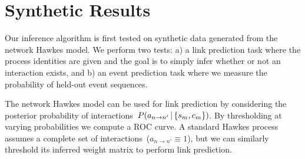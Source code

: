 \section{Synthetic Results}
\label{sec:synth}
Our inference algorithm is first tested on synthetic data generated
from the network Hawkes model. We perform two tests: a) a link
prediction task where the process identities are given and the goal is
to simply infer whether or not an interaction exists, and b) an event
prediction task where we measure the probability of held-out event
sequences.

The network Hawkes model can be used for link prediction by
considering the posterior probability of interactions~$P(a_{n \to
  n'}\,|\, \{s_m,c_m\})$. By thresholding at varying probabilities we
compute a ROC curve. A standard Hawkes process assumes a complete set
of interactions~($a_{n \to n'}\equiv 1$), but we can similarly threshold
its inferred weight matrix to perform link prediction.

